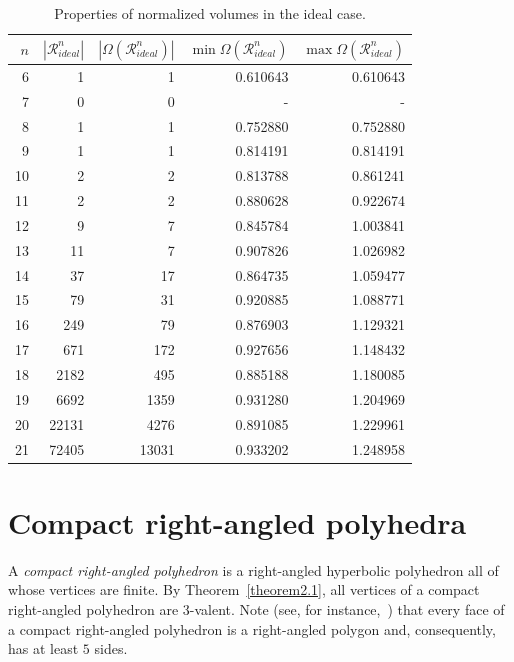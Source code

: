 \documentclass{amsart}
\begin{document}
\begin{table}[ht] \caption{Properties of normalized volumes in the ideal case.} \label{table1} 
\begin{center} 
\begin{tabular}{|r|r|r|r|r|} \hline
$n$ & $| \mathcal R^n_{ideal}| $ & $ |\Omega(\mathcal R^n_{ideal})|$ & $\min \Omega(\mathcal R^n_{ideal})$ & $\max \Omega(\mathcal R^n_{ideal})$  \\ \hline \hline 
6 & 1 & 1 & 0.610643  & 0.610643\\ \hline 
7 & 0 & 0 & - & -\\ \hline
8 & 1 & 1 & 0.752880 & 0.752880 \\ \hline
9 & 1 & 1 & 0.814191 & 0.814191 \\ \hline
10 & 2 & 2 & 0.813788  & 0.861241  \\ \hline
11 & 2 & 2 & 0.880628 & 0.922674   \\ \hline
12 & 9 & 7 &  0.845784 & 1.003841  \\ \hline
13 & 11 & 7 &  0.907826 & 1.026982  \\ \hline
14 & 37 & 17 & 0.864735 & 1.059477   \\ \hline
15 & 79 & 31 & 0.920885 & 1.088771   \\ \hline
16 & 249 & 79 & 0.876903 & 1.129321   \\ \hline
17 & 671 & 172 & 0.927656  & 1.148432  \\ \hline
18 & 2182 & 495 & 0.885188  & 1.180085  \\ \hline
19 & 6692 & 1359 & 0.931280 & 1.204969   \\ \hline
20 & 22131 & 4276 & 0.891085 & 1.229961   \\ \hline
21 & 72405 & 13031 & 0.933202 & 1.248958  \\ \hline
\end{tabular}
\end{center}
\end{table}

\section{Compact right-angled polyhedra} \label{prelim-compact}

 A \textit{compact right-angled polyhedron} is a right-angled hyperbolic polyhedron all of whose vertices are finite. By Theorem~\ref{theorem2.1}, all vertices of a compact right-angled polyhedron are 3-va\-lent. Note (see, for instance,~\cite[Th.~3.2]{In08}) that every face of a compact right-angled polyhedron is a right-angled polygon and, consequently, has at least $5$ sides.
\end{document}
